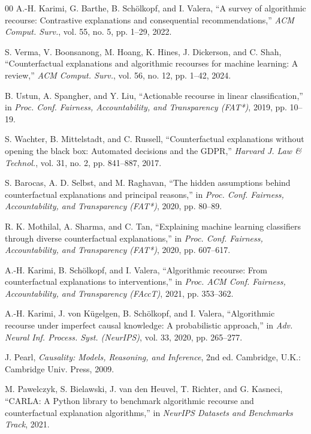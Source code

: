 \documentclass[nolineno]{paper/ieee-access/ieeeaccess}%
\begin{document}
\begin{thebibliography}{00}
A.-H. Karimi, G. Barthe, B. Sch{\"o}lkopf, and I. Valera,
``A survey of algorithmic recourse: Contrastive explanations and consequential recommendations,''
\emph{ACM Comput. Surv.}, vol. 55, no. 5, pp. 1--29, 2022.

S. Verma, V. Boonsanong, M. Hoang, K. Hines, J. Dickerson, and C. Shah,
``Counterfactual explanations and algorithmic recourses for machine learning: A review,''
\emph{ACM Comput. Surv.}, vol. 56, no. 12, pp. 1--42, 2024.

B. Ustun, A. Spangher, and Y. Liu,
``Actionable recourse in linear classification,''
in \emph{Proc. Conf. Fairness, Accountability, and Transparency (FAT*)}, 2019, pp. 10--19.

S. Wachter, B. Mittelstadt, and C. Russell,
``Counterfactual explanations without opening the black box: Automated decisions and the {GDPR},''
\emph{Harvard J. Law \& Technol.}, vol. 31, no. 2, pp. 841--887, 2017.

S. Barocas, A. D. Selbst, and M. Raghavan,
``The hidden assumptions behind counterfactual explanations and principal reasons,''
in \emph{Proc. Conf. Fairness, Accountability, and Transparency (FAT*)}, 2020, pp. 80--89.

R. K. Mothilal, A. Sharma, and C. Tan,
``Explaining machine learning classifiers through diverse counterfactual explanations,''
in \emph{Proc. Conf. Fairness, Accountability, and Transparency (FAT*)}, 2020, pp. 607--617.

A.-H. Karimi, B. Sch{\"o}lkopf, and I. Valera,
``Algorithmic recourse: From counterfactual explanations to interventions,''
in \emph{Proc. ACM Conf. Fairness, Accountability, and Transparency (FAccT)}, 2021, pp. 353--362.

A.-H. Karimi, J. von K{\"u}gelgen, B. Sch{\"o}lkopf, and I. Valera,
``Algorithmic recourse under imperfect causal knowledge: A probabilistic approach,''
in \emph{Adv. Neural Inf. Process. Syst. (NeurIPS)}, vol. 33, 2020, pp. 265--277.

J. Pearl,
\emph{Causality: Models, Reasoning, and Inference}, 2nd ed.
Cambridge, U.K.: Cambridge Univ. Press, 2009.

M. Pawelczyk, S. Bielawski, J. van den Heuvel, T. Richter, and G. Kasneci,
``{CARLA}: A {Python} library to benchmark algorithmic recourse and counterfactual explanation algorithms,''
in \emph{NeurIPS Datasets and Benchmarks Track}, 2021.


\end{thebibliography}
\end{document}
